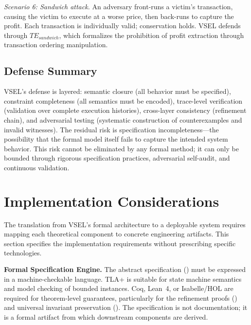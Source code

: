 \documentclass[11pt,a4paper]{article}
\theoremstyle{definition}
\begin{document}
\noindent\emph{Scenario 6: Sandwich attack.} An adversary front-runs a victim's transaction, causing the victim to execute at a worse price, then back-runs to capture the profit. Each transaction is individually valid; conservation holds. VSEL defends through $\mathit{TE}_{\mathit{sandwich}}$, which formalizes the prohibition of profit extraction through transaction ordering manipulation.

\subsection{Defense Summary}
\label{subsec:defense-summary}

VSEL's defense is layered: semantic closure (all behavior must be specified), constraint completeness (all semantics must be encoded), trace-level verification (validation over complete execution histories), cross-layer consistency (refinement chain), and adversarial testing (systematic construction of counterexamples and invalid witnesses). The residual risk is specification incompleteness---the possibility that the formal model itself fails to capture the intended system behavior. This risk cannot be eliminated by any formal method; it can only be bounded through rigorous specification practices, adversarial self-audit, and continuous validation.

\section{Implementation Considerations}
\label{sec:implementation}

The translation from VSEL's formal architecture to a deployable system requires mapping each theoretical component to concrete engineering artifacts. This section specifies the implementation requirements without prescribing specific technologies.

\noindent\textbf{Formal Specification Engine.} The abstract specification () must be expressed in a machine-checkable language. TLA+ is suitable for state machine semantics and model checking of bounded instances. Coq, Lean~4, or Isabelle/HOL are required for theorem-level guarantees, particularly for the refinement proofs () and universal invariant preservation (). The specification is not documentation; it is a formal artifact from which downstream components are derived.
\end{document}
